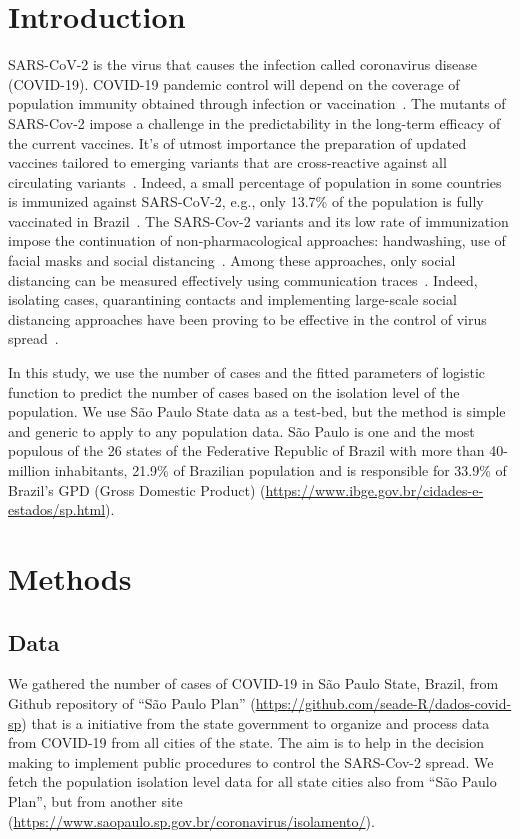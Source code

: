 \documentclass[review]{elsarticle}
\begin{document}
\linenumbers

\section{Introduction}

\hbox{SARS-CoV-2} is the virus that causes the infection called coronavirus disease (\hbox{COVID-19}). 
COVID-19 pandemic control will depend on the coverage of population immunity obtained 
through infection or vaccination~\cite{WHOa}. The mutants of SARS-Cov-2 impose a challenge in 
the predictability in the long-term efficacy of the current vaccines. 
 It’s of utmost importance the preparation of updated vaccines tailored 
to emerging variants that are cross-reactive against all circulating variants~\cite{Harvey2021}. 
Indeed, a small percentage of population in some countries is immunized against SARS-CoV-2, 
e.g., only 13.7\% of the population is fully vaccinated in Brazil~\cite{MH2021}.
The SARS-Cov-2 variants and its low rate of immunization impose the continuation of 
non-pharmacological approaches: handwashing, use of facial masks and social distancing~\cite{WHOb}. 
Among these approaches, only social distancing can be measured effectively using 
communication traces~\cite{Farrahi2014}. 
Indeed, isolating cases, quarantining contacts and implementing
large-scale social distancing approaches have been proving to 
be effective in the control of virus spread~\cite{Aquino2020}.

In this study, we use the number of cases and the fitted parameters of logistic function 
to predict the number of cases based on the isolation level of the population. 
We use São Paulo State data as a test-bed, but the method is simple and generic 
to apply to any population data. 
São Paulo is one and the most populous of the 26 states 
of the Federative Republic of Brazil with 
more than 40-million inhabitants, 21.9\% 
of Brazilian population and is responsible for 33.9\% 
of Brazil’s GPD (Gross Domestic Product) (\url{https://www.ibge.gov.br/cidades-e-estados/sp.html}).

\section{Methods}

\subsection{Data}

We gathered the number of cases of COVID-19 in São Paulo State, Brazil, from Github 
repository of ``São Paulo Plan'' (\url{https://github.com/seade-R/dados-covid-sp}) 
that is a initiative from the state government to organize and process data from COVID-19 
from all cities of the state. The aim is to help in the decision making to implement public 
procedures to control the SARS-Cov-2 spread. We fetch the population isolation level data 
for all state cities also from 
``São Paulo Plan'', but from another site (\url{https://www.saopaulo.sp.gov.br/coronavirus/isolamento/}).
\end{document}
